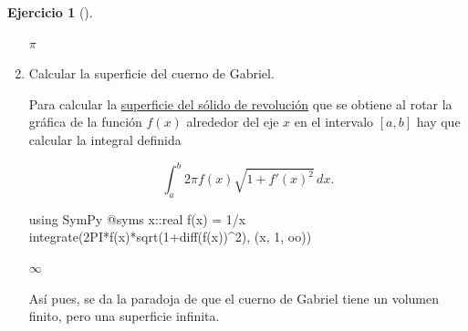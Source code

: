 \documentclass[
  a4paper,
]{scrreport}
\newenvironment{Shaded}{\begin{snugshade}}{\end{snugshade}}
\newcommand{\BuiltInTok}[1]{\textcolor[rgb]{0.00,0.23,0.31}{#1}}
\newcommand{\DataTypeTok}[1]{\textcolor[rgb]{0.68,0.00,0.00}{#1}}
\newcommand{\FloatTok}[1]{\textcolor[rgb]{0.68,0.00,0.00}{#1}}
\newcommand{\FunctionTok}[1]{\textcolor[rgb]{0.28,0.35,0.67}{#1}}
\newcommand{\ImportTok}[1]{\textcolor[rgb]{0.00,0.46,0.62}{#1}}
\newcommand{\NormalTok}[1]{\textcolor[rgb]{0.00,0.23,0.31}{#1}}
\newcommand{\OperatorTok}[1]{\textcolor[rgb]{0.37,0.37,0.37}{#1}}
\newcommand{\PreprocessorTok}[1]{\textcolor[rgb]{0.68,0.00,0.00}{#1}}
\theoremstyle{definition}
\newtheorem{exercise}{Ejercicio}[chapter]
\theoremstyle{remark}
\begin{document}
\begin{exercise}[]
\begin{enumerate}
\begin{tcolorbox}
  $\pi$

  \end{tcolorbox}
\item
  Calcular la superficie del cuerno de Gabriel.

  \begin{tcolorbox}[enhanced jigsaw, bottomtitle=1mm, rightrule=.15mm, left=2mm, colback=white, title=\textcolor{quarto-callout-note-color}{\faInfo}\hspace{0.5em}{Ayuda}, bottomrule=.15mm, colframe=quarto-callout-note-color-frame, toprule=.15mm, leftrule=.75mm, opacityback=0, coltitle=black, breakable, colbacktitle=quarto-callout-note-color!10!white, arc=.35mm, toptitle=1mm, titlerule=0mm, opacitybacktitle=0.6]

  Para calcular la
  \href{https://aprendeconalf.es/analisis-manual/09-integrales.html\#c\%C3\%A1lculo-de-superficies-de-s\%C3\%B3lidos-de-revoluci\%C3\%B3n}{superficie
  del sólido de revolución} que se obtiene al rotar la gráfica de la
  función \(f(x)\) alrededor del eje \(x\) en el intervalo \([a,b]\) hay
  que calcular la integral definida

  \[
  \int_a^b 2\pi f(x)\sqrt{1+f'(x)^2}\,dx.
  \]

  \end{tcolorbox}

  \begin{tcolorbox}[enhanced jigsaw, bottomtitle=1mm, rightrule=.15mm, left=2mm, colback=white, title=\textcolor{quarto-callout-tip-color}{\faLightbulb}\hspace{0.5em}{Solución}, bottomrule=.15mm, colframe=quarto-callout-tip-color-frame, toprule=.15mm, leftrule=.75mm, opacityback=0, coltitle=black, breakable, colbacktitle=quarto-callout-tip-color!10!white, arc=.35mm, toptitle=1mm, titlerule=0mm, opacitybacktitle=0.6]

\begin{Shaded}
\begin{Highlighting}[]
\ImportTok{using} \BuiltInTok{SymPy}
\PreprocessorTok{@syms}\NormalTok{ x}\OperatorTok{::}\DataTypeTok{real}
\FunctionTok{f}\NormalTok{(x) }\OperatorTok{=} \FloatTok{1}\OperatorTok{/}\NormalTok{x}
\FunctionTok{integrate}\NormalTok{(}\FloatTok{2}\FunctionTok{PI*f}\NormalTok{(x)}\FunctionTok{*sqrt}\NormalTok{(}\FloatTok{1}\FunctionTok{+diff}\NormalTok{(}\FunctionTok{f}\NormalTok{(x))}\OperatorTok{\^{}}\FloatTok{2}\NormalTok{), (x, }\FloatTok{1}\NormalTok{, oo))}
\end{Highlighting}
\end{Shaded}

  $\infty$

  Así pues, se da la paradoja de que el cuerno de Gabriel tiene un
  volumen finito, pero una superficie infinita.

  \end{tcolorbox}
\end{enumerate}

\end{exercise}
\end{document}
